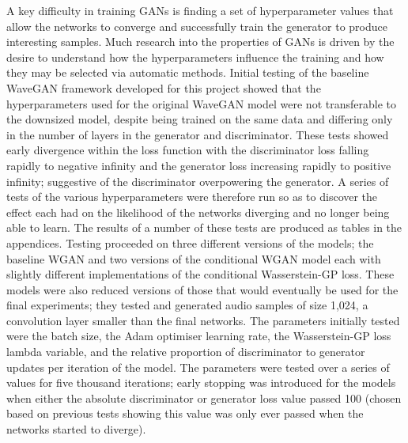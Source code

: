 \documentclass[a4paper, titlepage]{article}
\begin{document}
A key difficulty in training \ac{GAN}s is finding a set of hyperparameter values that allow the networks to converge and successfully train the generator to produce interesting samples.
Much research into the properties of \ac{GAN}s is driven by the desire to understand how the hyperparameters influence the training and how they may be selected via automatic methods.
\newline
\newline
Initial testing of the baseline WaveGAN framework developed for this project showed that the hyperparameters used for the original WaveGAN model were not transferable to the downsized model, despite being trained on the same data and differing only in the number of layers in the generator and discriminator.
These tests showed early divergence within the loss function with the discriminator loss falling rapidly to negative infinity and the generator loss increasing rapidly to positive infinity; suggestive of the discriminator overpowering the generator.
\newline
\newline
A series of tests of the various hyperparameters were therefore run so as to discover the effect each had on the likelihood of the networks diverging and no longer being able to learn.
The results of a number of these tests are produced as tables in the appendices.
\newline
\newline
Testing proceeded on three different versions of the models; the baseline WGAN and two versions of the conditional WGAN model each with slightly different implementations of the conditional Wasserstein-GP loss.
These models were also reduced versions of those that would eventually be used for the final experiments; they tested and generated audio samples of size 1,024, a convolution layer smaller than the final networks.
\newline
\newline
The parameters initially tested were the batch size, the Adam optimiser learning rate, the Wasserstein-GP loss lambda variable, and the relative proportion of discriminator to generator updates per iteration of the model.
The parameters were tested over a series of values for five thousand iterations; early stopping was introduced for the models when either the absolute discriminator or generator loss value passed 100 (chosen based on previous tests showing this value was only ever passed when the networks started to diverge).
\newline
\newline
\end{document}
